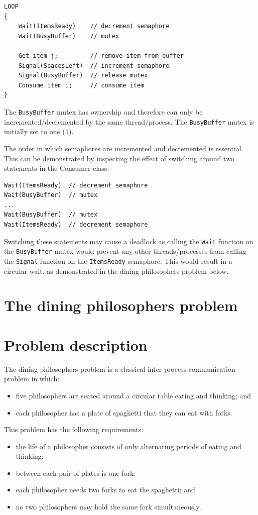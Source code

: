 \documentclass[a4paper]{systems-software}
\begin{document}
\begin{lstlisting}[title={Consumer class.}]
LOOP
{
	Wait(ItemsReady)    // decrement semaphore
	Wait(BusyBuffer)    // mutex

	Get item j;         // remove item from buffer
	Signal(SpacesLeft)  // increment semaphore
	Signal(BusyBuffer)  // release mutex
	Consume item i;     // consume item
}
\end{lstlisting}

The \texttt{BusyBuffer} mutex has ownership and therefore can only be incremented/decremented by the same thread/process. The \texttt{BusyBuffer} mutex is initially set to one (\texttt{1}).

The order in which semaphores are incremented and decremented is essential. This can be demonstrated by inspecting the effect of switching around two statements in the Consumer class:
\begin{lstlisting}
Wait(ItemsReady)  // decrement semaphore
Wait(BusyBuffer)  // mutex
...
Wait(BusyBuffer)  // mutex
Wait(ItemsReady)  // decrement semaphore
\end{lstlisting}

Switching these statements may cause a deadlock as calling the \texttt{Wait} function on the \texttt{BusyBuffer} mutex would prevent any other threads/processes from calling the \texttt{Signal} function on the \texttt{ItemsReady} semaphore. This would result in a circular wait, as demonstrated in the dining philosophers problem below.


\section{The dining philosophers problem}

\section*{Problem description}

The dining philosophers problem is a classical inter-process communication problem in which:
\begin{itemize}
	\item five philosophers are seated around a circular table eating and thinking; and
	\item each philosopher has a plate of spaghetti that they can eat with forks.
\end{itemize}

This problem has the following requirements:
\begin{itemize}
	\item the life of a philosopher consists of only alternating periods of eating and thinking;
	\item between each pair of plates is one fork;
	\item each philosopher needs two forks to eat the spaghetti; and
	\item no two philosophers may hold the same fork simultaneously.
\end{itemize}
\end{document}
